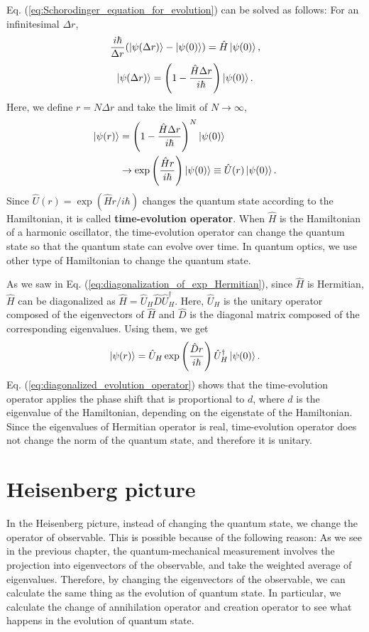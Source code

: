 \documentclass{book}
\begin{document}
Eq. (\ref{eq:Schorodinger_equation_for_evolution}) can be solved as follows:
For an infinitesimal $\Delta r$, 
\begin{equation}
  \frac{i\hbar}{\Delta r} (\ket{\psi(\Delta r)} - \ket{\psi(0)}) = \hat H \ket{\psi(0)},
\end{equation}
\begin{equation}
  \ket{\psi(\Delta r)} = \left(1 - \frac{\hat H\Delta r}{i\hbar}\right) \ket{\psi(0)}.
\end{equation}
Here, we define $r = N\Delta r$ and take the limit of $N \to \infty$,
\begin{equation}
\begin{aligned}
  \ket{\psi(r)} &= \left(1 - \frac{\hat H\Delta r}{i\hbar}\right)^N \ket{\psi(0)}\\
  &\to \exp\left(\frac{\hat Hr}{i\hbar}\right)\ket {\psi(0)} \equiv \hat U(r)\ket {\psi(0)}.
\end{aligned}
\end{equation}
Since $\hat U(r) = \exp(\hat Hr/i\hbar)$ changes the quantum state according to the Hamiltonian, it is called \textbf{time-evolution operator}. When $\hat H$ is the Hamiltonian of a harmonic oscillator, the time-evolution operator can change the quantum state so that the quantum state can evolve over time. In quantum optics, we use other type of Hamiltonian to change the quantum state. 

As we saw in Eq. (\ref{eq:diagonalization_of_exp_Hermitian}), since $\hat H$ is Hermitian, $\hat H$ can be diagonalized as $\hat H = \hat U_H\hat D\hat U_H^\dagger$. Here, $\hat U_H$ is the unitary operator composed of the eigenvectors of $\hat H$ and $\hat D$ is the diagonal matrix composed of the corresponding eigenvalues. Using them, we get
\begin{equation}
  \ket{\psi(r)} = \hat U_H\exp \left( \frac{\hat Dr}{i\hbar} \right)\hat U_H^\dagger \ket{\psi(0)}.
  \label{eq:diagonalized_evolution_operator}
\end{equation}
Eq. (\ref{eq:diagonalized_evolution_operator}) shows that the time-evolution operator applies the phase shift that is proportional to $d$, where $d$ is the eigenvalue of the Hamiltonian, depending on the eigenstate of the Hamiltonian. Since the eigenvalues of Hermitian operator is real, time-evolution operator does not change the norm of the quantum state, and therefore it is unitary.

\section{Heisenberg picture}
In the Heisenberg picture, instead of changing the quantum state, we change the operator of observable. This is possible because of the following reason: As we see in the previous chapter, the quantum-mechanical measurement involves  the projection into eigenvectors of the observable, and take the weighted average of eigenvalues. Therefore, by changing the eigenvectors of the observable, we can calculate the same thing as the evolution of quantum state. In particular, we calculate the change of annihilation operator and creation operator to see what happens in the evolution of quantum state.
\end{document}
